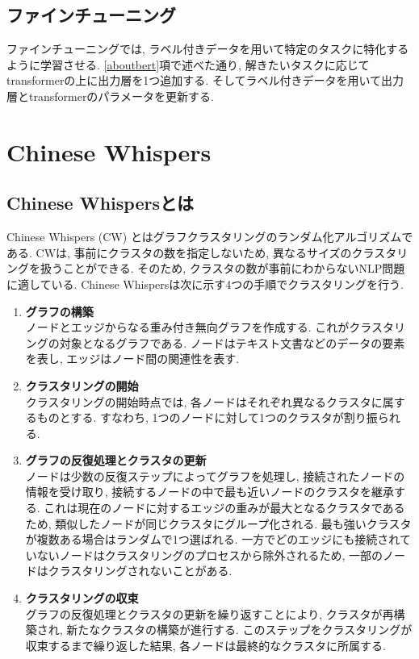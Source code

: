 \subsection{ファインチューニング}
ファインチューニングでは, ラベル付きデータを用いて特定のタスクに特化するように学習させる. \ref{aboutbert}項で述べた通り, 解きたいタスクに応じてtransformerの上に出力層を1つ追加する. そしてラベル付きデータを用いて出力層とtransformerのパラメータを更新する. 


\section{Chinese Whispers}
\subsection{Chinese Whispersとは}
Chinese Whispers (CW) \cite{chinese-whispers}とはグラフクラスタリングのランダム化アルゴリズムである. CWは, 事前にクラスタの数を指定しないため, 異なるサイズのクラスタリングを扱うことができる. そのため, クラスタの数が事前にわからないNLP問題に適している. 
Chinese Whispersは次に示す4つの手順でクラスタリングを行う. 

\begin{enumerate}[label=\textbf{\arabic*.}]
  \item \textbf{グラフの構築}\\
  ノードとエッジからなる重み付き無向グラフを作成する. これがクラスタリングの対象となるグラフである. ノードはテキスト文書などのデータの要素を表し, エッジはノード間の関連性を表す. \\
  
  \item \textbf{クラスタリングの開始}\\
  クラスタリングの開始時点では, 各ノードはそれぞれ異なるクラスタに属するものとする. すなわち, 1つのノードに対して1つのクラスタが割り振られる. \\
  
  \item \textbf{グラフの反復処理とクラスタの更新}\\
  ノードは少数の反復ステップによってグラフを処理し, 接続されたノードの情報を受け取り, 接続するノードの中で最も近いノードのクラスタを継承する. これは現在のノードに対するエッジの重みが最大となるクラスタであるため, 類似したノードが同じクラスタにグループ化される. 
  最も強いクラスタが複数ある場合はランダムで1つ選ばれる. 一方でどのエッジにも接続されていないノードはクラスタリングのプロセスから除外されるため, 一部のノードはクラスタリングされないことがある. \\
  
  \item \textbf{クラスタリングの収束}\\
  グラフの反復処理とクラスタの更新を繰り返すことにより, クラスタが再構築され, 新たなクラスタの構築が進行する. このステップをクラスタリングが収束するまで繰り返した結果, 各ノードは最終的なクラスタに所属する. 
\end{enumerate}